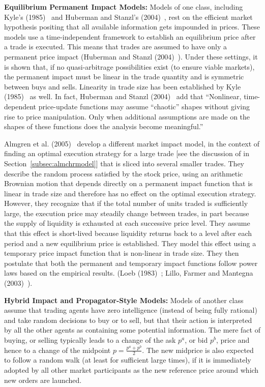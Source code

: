 \noindent\textbf{Equilibrium Permanent Impact Models:} Models of one class, including Kyle's (1985)~\cite{kyle1985} and Huberman and Stanzl's (2004)~\cite{huberstan}, rest on the efficient market hypothesis positing that all available information gets impounded in prices. These models use a time-independent framework to establish an equilibrium price after a trade is executed. This means that trades are assumed to have only a permanent price impact (Huberman and Stanzl (2004)~\cite[p.1260]{huberstan}). Under these settings, it is shown that, if no quasi-arbitrage possibilities exist (to ensure viable markets), the permanent impact must be linear in the trade quantity and is symmetric between buys and sells. Linearity in trade size has been established by Kyle (1985)~\cite{kyle1985} as well. In fact, Huberman and Stanzl (2004)~\cite{huberstan} add that ``Nonlinear, time-dependent price-update functions may assume ``chaotic'' shapes without giving rise to price manipulation. Only when additional assumptions are made on the shapes of these functions does the analysis become meaningful.''


Almgren et al. (2005)~\cite{athl} develop a different market impact model, in the context of finding an optimal execution strategy for a large trade [see the discussion of in Section~\ref{subsec:almchrmodel}] that is sliced into several smaller trades. They describe the random process satisfied by the stock price, using an arithmetic Brownian motion that depends directly on a permanent impact function that is linear in trade size and therefore has no effect on the optimal execution strategy. However, they recognize that if the total number of units traded is sufficiently large, the execution price may steadily change between trades, in part because the supply of liquidity is exhausted at each successive price level. They assume that this effect is short-lived because liquidity returns back to a level after each period and a new equilibrium price is established. They model this effect using a temporary price impact function that is non-linear in trade size. They then postulate that both the permanent and temporary impact functions follow power laws based on the empirical results. (Loeb (1983)~\cite{loeb}; Lillo, Farmer and Mantegna (2003)~\cite{farmermantegna}). \twomedskip


\noindent \textbf{Hybrid Impact and Propagator-Style Models:} Models of another class assume that trading agents have zero intelligence (instead of being fully rational) and take random decisions to buy or to sell, but that their action is interpreted by all the other agents as containing some potential information. The mere fact of buying, or selling typically leads to a change of the ask $p^a$, or bid $p^b$, price and hence to a change of the midpoint $p= \frac{p^a+p^b}{2}$. The new midprice is also expected to follow a random walk (at least for sufficient large times), if it is immediately adopted by all other market participants as the new reference price around which new orders are launched.


